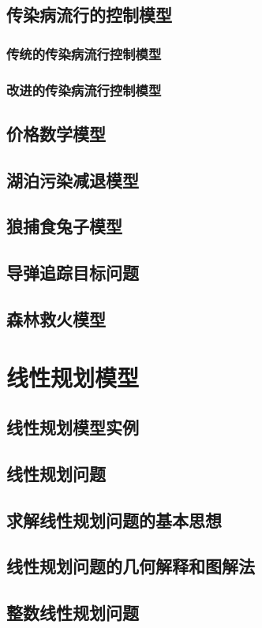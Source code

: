 \documentclass[openany]{progbookcn}
\begin{document}
\section{传染病流行的控制模型}
\subsection{传统的传染病流行控制模型}
\subsection{改进的传染病流行控制模型}
\section{价格数学模型}
\section{湖泊污染减退模型}
\section{狼捕食兔子模型}
\section{导弹追踪目标问题}
\section{森林救火模型}

\chapter{线性规划模型}
\section{线性规划模型实例}
\section{线性规划问题}
\section{求解线性规划问题的基本思想}
\section{线性规划问题的几何解释和图解法}
\section{整数线性规划问题}
\end{document}
